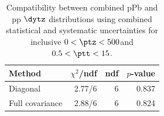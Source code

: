 \begin{table}[htp!]
\centering
\begin{tabular}{|l|r|r|r|}
\hline
Method & $\chi^2$/ndf & ndf & $p$-value \\
\hline
Diagonal & 2.77/6 & 6 & 0.837 \\
Full covariance & 2.88/6 & 6 & 0.824 \\
\hline
\end{tabular}
\caption{Compatibility between combined pPb and pp $\dytz$ distributions using combined statistical and systematic uncertainties for inclusive $0 < \ptz < 500$\GeV and $0.5 < \ptt < 15$\GeV.}
\label{table:chisq_deta}
\end{table}
